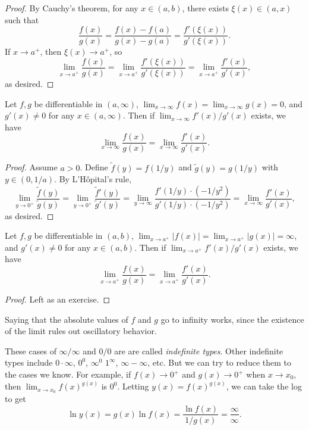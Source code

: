 \begin{proof}
  By Cauchy's theorem, for any $x \in (a, b)$, there
  exists $\xi(x) \in (a, x)$ such that
  \[
    \frac{f(x)}{g(x)} = \frac{f(x) - f(a)}{g(x) - g(a)}
    = \frac{f'(\xi(x))}{g'(\xi(x))}.
  \]
  If $x \to a^+$, then $\xi(x) \to a^+$, so
  \[
    \lim_{x \to a^+} \frac{f(x)}{g(x)}
    = \lim_{x \to a^+} \frac{f'(\xi(x))}{g'(\xi(x))}
    = \lim_{x \to a^+} \frac{f'(x)}{g'(x)},
  \]
  as desired.
\end{proof}

\begin{corollary}
  Let $f, g$ be differentiable in $(a, \infty)$,
  $\lim_{x \to \infty} f(x) = \lim_{x \to \infty} g(x) = 0$,
  and $g'(x) \ne 0$ for any $x \in (a, \infty)$. Then
  if $\lim_{x \to \infty} f'(x)/g'(x)$ exists, we have
  \[
    \lim_{x \to \infty} \frac{f(x)}{g(x)} = \lim_{x \to \infty} \frac{f'(x)}{g'(x)}.
  \]
\end{corollary}

\begin{proof}
  Assume $a > 0$. Define $\widetilde{f}(y) = f(1/y)$ and
  $\widetilde{g}(y) = g(1/y)$ with $y \in (0, 1 / a)$.
  By L'H\^opital's rule,
  \[
    \lim_{y \to 0^+} \frac{\widetilde{f}(y)}{\widetilde{g}(y)}
    = \lim_{y \to 0^+} \frac{\widetilde{f}'(y)}{\widetilde{g}'(y)}
    = \lim_{y \to \infty} \frac{f'(1 / y) \cdot (-1 / y^2)}{g'(1 / y) \cdot (-1 / y^2)}
    = \lim_{x \to \infty} \frac{f'(x)}{g'(x)},
  \]
  as desired.
\end{proof}

\begin{theorem}
  Let $f, g$ be differentiable in $(a, b)$,
  $\lim_{x \to a^+} |f(x)| = \lim_{x \to a^+} |g(x)| = \infty$,
  and $g'(x) \ne 0$ for any $x \in (a, b)$. Then
  if $\lim_{x \to a^+} f'(x)/g'(x)$ exists, we have
  \[
    \lim_{x \to a^+} \frac{f(x)}{g(x)} = \lim_{x \to a^+} \frac{f'(x)}{g'(x)}.
  \]
\end{theorem}

\begin{proof}
  Left as an exercise.
\end{proof}

\begin{remark}
  Saying that the absolute values of $f$ and $g$ go to
  infinity works, since the existence of the limit rules
  out oscillatory behavior.
\end{remark}

\begin{remark}
  These cases of $\infty / \infty$ and $0 / 0$ are
  are called \emph{indefinite types}. Other indefinite
  types include $0 \cdot \infty$, $0^0$, $\infty^0$
  $1^\infty$, $\infty - \infty$, etc. But we can try
  to reduce them to the cases we know. For example,
  if $f(x) \to 0^+$ and $g(x) \to 0^+$ when $x \to x_0$,
  then $\lim_{x \to x_0} f(x)^{g(x)}$ is $0^0$.
  Letting $y(x) = f(x)^{g(x)}$, we can take the log
  to get
  \[
    \ln y(x) = g(x) \ln f(x) = \frac{\ln f(x)}{1 / g(x)}
    = \frac{\infty}{\infty}.
  \]
\end{remark}

